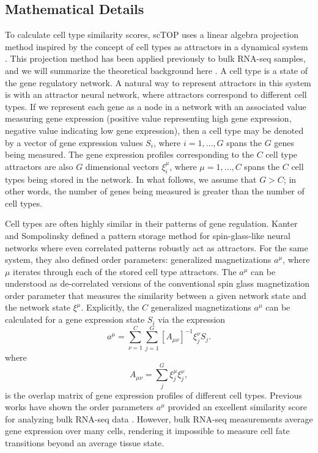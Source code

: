 \documentclass[aps,superscriptaddress, notitlepage,longbibliography]{revtex4-1}
\def\be{\begin{equation}}
\def\ee{\end{equation}}
\begin{document}
\subsection{Mathematical Details}
To calculate cell type similarity scores, scTOP uses a linear algebra projection method inspired by the concept of cell types as attractors in a dynamical system \cite{huang_cell_2005}. This projection method has been applied previously to bulk RNA-seq samples, and we will summarize the theoretical background here \cite{lang_epigenetic_2014}. A cell type is a state of the gene regulatory network. A natural way to represent attractors in this system is with an attractor neural network, where attractors correspond to different cell types. If we represent each gene as a node in a network with an associated value measuring gene expression (positive value representing high gene expression, negative value indicating low gene expression), then a cell type may be denoted by a vector of gene expression values $S_i$, where $i=1,\ldots, G$ spans the $G$ genes being measured. The gene expression profiles
corresponding to the $C$ cell type attractors are also $G$ dimensional vectors $\xi_i^\mu$, where $\mu=1,\ldots, C$ spans the $C$ cell types being stored in the network. In what follows, we assume that $G > C$; in other words, the number of genes being measured is greater than the number of cell types.

Cell types are often highly similar in their patterns of gene regulation. Kanter and Sompolinsky \cite{kanter_associative_1987} defined a pattern storage method for spin-glass-like neural networks where even correlated patterns robustly act as attractors. For the same system, they also defined order parameters: generalized magnetizations $a^{\mu}$, where $\mu$ iterates through each of the stored cell type attractors. The $a^\mu$ can be understood as de-correlated versions of the conventional spin glass magnetization order parameter that measures the similarity between a given network state and the network state $\xi^\mu$. 
Explicitly, the $C$ generalized magnetizations $a^\mu$ can be calculated for a gene expression state $S_i$ via the expression
\be \label{op_eqn}
a^\mu= \sum_{\nu=1}^C\sum_{j=1}^G [A_{\mu \nu}]^{-1}\xi_j^\nu S_j.
\ee
where
\be
A_{\mu \nu}= \sum_{j}^G  \xi_j^\mu \xi_j^\nu,
\ee
is the overlap matrix of gene expression profiles of different cell types. Previous works have shown the order parameters $a^{\mu}$ provided an excellent similarity score for analyzing bulk RNA-seq data \cite{lang_epigenetic_2014,pusuluri_cellular_2017, dame_thyroid_2017,ikonomou_vivo_2020}. However, bulk RNA-seq measurements average gene expression over many cells, rendering it impossible to measure cell fate transitions beyond an average tissue state. 
\end{document}
